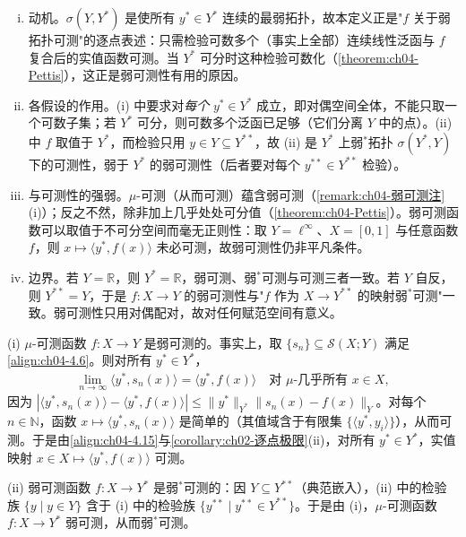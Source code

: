 \documentclass[../../main.tex]{subfiles}%
\begin{document}
\begin{remark}\label{remark:ch04-弱可测动机}
\begin{enumerate}[(i)]
\item 动机。$\sigma(Y,Y^*)$ 是使所有 $y^*\in Y^*$ 连续的最弱拓扑，故本定义正是"$f$ 关于弱拓扑可测"的逐点表述：只需检验可数多个（事实上全部）连续线性泛函与 $f$ 复合后的实值函数可测。当 $Y^*$ 可分时这种检验可数化（\cref{theorem:ch04-Pettis}），这正是弱可测性有用的原因。
\item 各假设的作用。(i) 中要求对\emph{每个} $y^*\in Y^*$ 成立，即对偶空间全体，不能只取一个可数子集；若 $Y^*$ 可分，则可数多个泛函已足够（它们分离 $Y$ 中的点）。(ii) 中 $f$ 取值于 $Y^*$，而检验只用 $y\in Y\subseteq Y^{**}$，故 (ii) 是 $Y^*$ 上弱$^*$拓扑 $\sigma(Y^*,Y)$ 下的可测性，弱于 $Y^*$ 的弱可测性（后者要对每个 $y^{**}\in Y^{**}$ 检验）。
\item 与可测性的强弱。$\mu$-可测（从而可测）蕴含弱可测（\cref{remark:ch04-弱可测注}(i)）；反之不然，除非加上几乎处处可分值（\cref{theorem:ch04-Pettis}）。弱可测函数可以取值于不可分空间而毫无正则性：取 $Y=\ell^\infty$、$X=[0,1]$ 与任意函数 $f$，则 $x\mapsto\langle y^*,f(x)\rangle$ 未必可测，故弱可测性仍非平凡条件。
\item 边界。若 $Y=\mathbb{R}$，则 $Y^*=\mathbb{R}$，弱可测、弱$^*$可测与可测三者一致。若 $Y$ 自反，则 $Y^{**}=Y$，于是 $f:X\to Y$ 的弱可测性与"$f$ 作为 $X\to Y^{**}$ 的映射弱$^*$可测"一致。弱可测性只用对偶配对，故对任何赋范空间有意义。
\end{enumerate}
\end{remark}

\begin{remark}\label{remark:ch04-弱可测注}
(i) $\mu$-可测函数 $f:X\to Y$ 是弱可测的。事实上，取 $\{s_n\}\subseteq\mathcal{S}(X;Y)$ 满足\eqref{align:ch04-4.6}。则对所有 $y^*\in Y^*$，
\begin{align}
\lim_{n\to\infty}\langle y^*,s_n(x)\rangle=\langle y^*,f(x)\rangle\quad\text{对 }\mu\text{-几乎所有 }x\in X, \label{align:ch04-4.15}
\end{align}
因为 $|\langle y^*,s_n(x)\rangle-\langle y^*,f(x)\rangle|\leqslant\|y^*\|_{Y^*}\|s_n(x)-f(x)\|_Y$。对每个 $n\in\mathbb{N}$，函数 $x\mapsto\langle y^*,s_n(x)\rangle$ 是简单的（其值域含于有限集 $\{\langle y^*,y_i\rangle\}$），从而可测。于是由\eqref{align:ch04-4.15}与\cref{corollary:ch02-逐点极限}(ii)，对所有 $y^*\in Y^*$，实值映射 $x\in X\mapsto\langle y^*,f(x)\rangle$ 可测。

(ii) 弱可测函数 $f:X\to Y^*$ 是弱$^*$可测的：因 $Y\subseteq Y^{**}$（典范嵌入），(ii) 中的检验族 $\{y\mid y\in Y\}$ 含于 (i) 中的检验族 $\{y^{**}\mid y^{**}\in Y^{**}\}$。于是由 (i)，$\mu$-可测函数 $f:X\to Y^*$ 弱可测，从而弱$^*$可测。
\end{remark}
\end{document}
